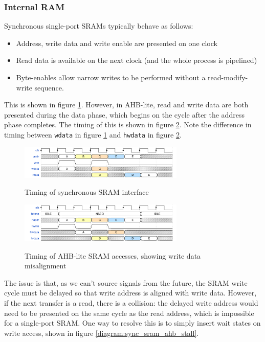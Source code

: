 \subsubsection{Internal RAM}

Synchronous single-port SRAMs typically behave as follows:

\begin{itemize}
	\item Address, write data and write enable are presented on one clock
	\item Read data is available on the next clock (and the whole process is pipelined)
	\item Byte-enables allow narrow writes to be performed without a read-modify-write sequence.
\end{itemize}

This is shown in figure \ref{diagram:sync_sram_only}. However, in AHB-lite, read and write data are both presented during the data phase, which begins on the cycle after the address phase completes. The timing of this is shown in figure \ref{diagram:sync_sram_ahb_access}. Note the difference in timing between {\tt wdata} in figure \ref{diagram:sync_sram_only} and {\tt hwdata} in figure \ref{diagram:sync_sram_ahb_access}.


\begin{figure}[H]
\centering
\caption{Timing of synchronous SRAM interface}
\includegraphics[width=0.7\textwidth]{waves/sync_sram_only.pdf}
\label{diagram:sync_sram_only}
\end{figure}


\begin{figure}[H]
\centering
\caption{Timing of AHB-lite SRAM accesses, showing write data misalignment}
\includegraphics[width=0.7\textwidth]{waves/sync_sram_ahb_access.pdf}
\label{diagram:sync_sram_ahb_access}
\end{figure}

The issue is that, as we can't source signals from the future, the SRAM write cycle must be delayed so that write address is aligned with write data. However, if the next transfer is a read, there is a collision: the delayed write address would need to be presented on the same cycle as the read address, which is impossible for a single-port SRAM. One way to resolve this is to simply insert wait states on write access, shown in figure \ref{diagram:sync_sram_ahb_stall}.

